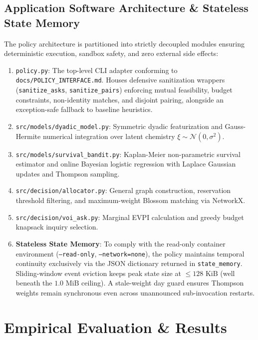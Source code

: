 \documentclass[10pt,twocolumn,letterpaper]{article}
\begin{document}
\subsection{Application Software Architecture \& Stateless State Memory}
The policy architecture is partitioned into strictly decoupled modules ensuring deterministic execution, sandbox safety, and zero external side effects:
\begin{enumerate}[leftmargin=*]
    \item \texttt{policy.py}: The top-level CLI adapter conforming to \texttt{docs/POLICY\_INTERFACE.md}. Houses defensive sanitization wrappers (\texttt{sanitize\_asks}, \texttt{sanitize\_pairs}) enforcing mutual feasibility, budget constraints, non-identity matches, and disjoint pairing, alongside an exception-safe fallback to baseline heuristics.
    \item \texttt{src/models/dyadic\_model.py}: Symmetric dyadic featurization and Gauss-Hermite numerical integration over latent chemistry $\xi \sim \mathcal{N}(0, \sigma^2)$.
    \item \texttt{src/models/survival\_bandit.py}: Kaplan-Meier non-parametric survival estimator and online Bayesian logistic regression with Laplace Gaussian updates and Thompson sampling.
    \item \texttt{src/decision/allocator.py}: General graph construction, reservation threshold filtering, and maximum-weight Blossom matching via NetworkX.
    \item \texttt{src/decision/voi\_ask.py}: Marginal EVPI calculation and greedy budget knapsack inquiry selection.
    \item \textbf{Stateless State Memory}: To comply with the read-only container environment (\texttt{--read-only}, \texttt{--network=none}), the policy maintains temporal continuity exclusively via the JSON dictionary returned in \texttt{state\_memory}. Sliding-window event eviction keeps peak state size at $\le 128\text{ KiB}$ (well beneath the $1.0\text{ MiB}$ ceiling). A stale-weight day guard ensures Thompson weights remain synchronous even across unannounced sub-invocation restarts.
\end{enumerate}

\section{Empirical Evaluation \& Results}
\label{sec:results}
\end{document}
